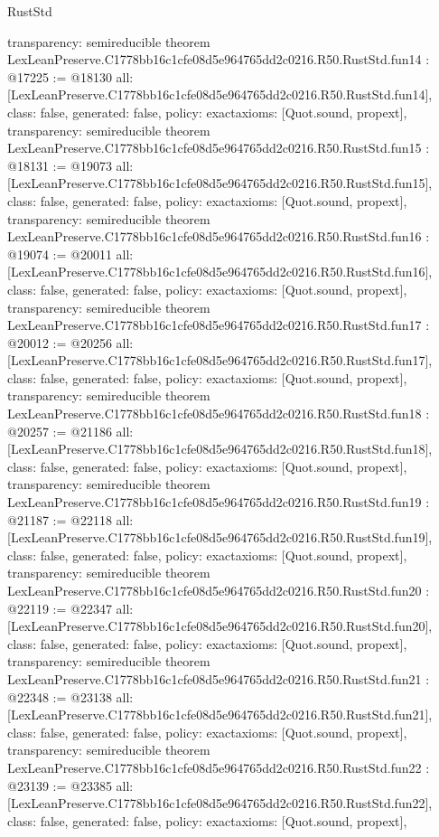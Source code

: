 \begin{lexlean}{RustStd}
\begin{coremodule}
{  transparency: semireducible
}
theorem LexLeanPreserve.C1778bb16c1cfe08d5e964765dd2c0216.R50.RustStd.fun14 : @17225 := @18130 {
  all: [LexLeanPreserve.C1778bb16c1cfe08d5e964765dd2c0216.R50.RustStd.fun14],
  class: false,
  generated: false,
  policy: exact{axioms: [Quot.sound, propext]},
  transparency: semireducible
}
theorem LexLeanPreserve.C1778bb16c1cfe08d5e964765dd2c0216.R50.RustStd.fun15 : @18131 := @19073 {
  all: [LexLeanPreserve.C1778bb16c1cfe08d5e964765dd2c0216.R50.RustStd.fun15],
  class: false,
  generated: false,
  policy: exact{axioms: [Quot.sound, propext]},
  transparency: semireducible
}
theorem LexLeanPreserve.C1778bb16c1cfe08d5e964765dd2c0216.R50.RustStd.fun16 : @19074 := @20011 {
  all: [LexLeanPreserve.C1778bb16c1cfe08d5e964765dd2c0216.R50.RustStd.fun16],
  class: false,
  generated: false,
  policy: exact{axioms: [Quot.sound, propext]},
  transparency: semireducible
}
theorem LexLeanPreserve.C1778bb16c1cfe08d5e964765dd2c0216.R50.RustStd.fun17 : @20012 := @20256 {
  all: [LexLeanPreserve.C1778bb16c1cfe08d5e964765dd2c0216.R50.RustStd.fun17],
  class: false,
  generated: false,
  policy: exact{axioms: [Quot.sound, propext]},
  transparency: semireducible
}
theorem LexLeanPreserve.C1778bb16c1cfe08d5e964765dd2c0216.R50.RustStd.fun18 : @20257 := @21186 {
  all: [LexLeanPreserve.C1778bb16c1cfe08d5e964765dd2c0216.R50.RustStd.fun18],
  class: false,
  generated: false,
  policy: exact{axioms: [Quot.sound, propext]},
  transparency: semireducible
}
theorem LexLeanPreserve.C1778bb16c1cfe08d5e964765dd2c0216.R50.RustStd.fun19 : @21187 := @22118 {
  all: [LexLeanPreserve.C1778bb16c1cfe08d5e964765dd2c0216.R50.RustStd.fun19],
  class: false,
  generated: false,
  policy: exact{axioms: [Quot.sound, propext]},
  transparency: semireducible
}
theorem LexLeanPreserve.C1778bb16c1cfe08d5e964765dd2c0216.R50.RustStd.fun20 : @22119 := @22347 {
  all: [LexLeanPreserve.C1778bb16c1cfe08d5e964765dd2c0216.R50.RustStd.fun20],
  class: false,
  generated: false,
  policy: exact{axioms: [Quot.sound, propext]},
  transparency: semireducible
}
theorem LexLeanPreserve.C1778bb16c1cfe08d5e964765dd2c0216.R50.RustStd.fun21 : @22348 := @23138 {
  all: [LexLeanPreserve.C1778bb16c1cfe08d5e964765dd2c0216.R50.RustStd.fun21],
  class: false,
  generated: false,
  policy: exact{axioms: [Quot.sound, propext]},
  transparency: semireducible
}
theorem LexLeanPreserve.C1778bb16c1cfe08d5e964765dd2c0216.R50.RustStd.fun22 : @23139 := @23385 {
  all: [LexLeanPreserve.C1778bb16c1cfe08d5e964765dd2c0216.R50.RustStd.fun22],
  class: false,
  generated: false,
  policy: exact{axioms: [Quot.sound, propext]},
}
\end{coremodule}
\end{lexlean}
